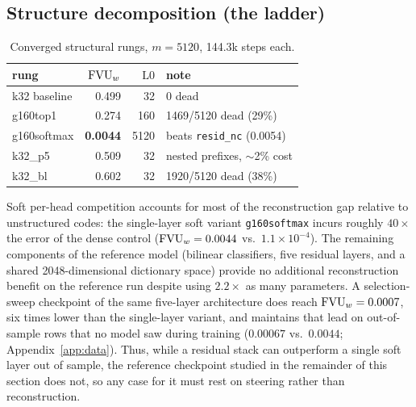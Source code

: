 \subsection{Structure decomposition (the ladder)}

\begin{table}[htbp]\centering\small
\begin{tabular}{@{}lrrl@{}}
\toprule
rung & $\mathrm{FVU}_w$ & $\mathrm{L0}$ & note \\
\midrule
k32 baseline    & 0.499 & 32   & 0 dead \\
g160top1        & 0.274 & 160  & 1469/5120 dead (29\%) \\
g160softmax     & \textbf{0.0044} & 5120 & beats \texttt{resid\_nc} (0.0054) \\
k32\_p5         & 0.509 & 32   & nested prefixes, $\sim$2\% cost \\
k32\_bl         & 0.602 & 32   & 1920/5120 dead (38\%) \\
\bottomrule
\end{tabular}
\caption{Converged structural rungs, $m{=}5120$, 144.3k steps each.}
\end{table}

Soft per-head competition accounts for most of the reconstruction gap
relative to unstructured codes: the single-layer soft variant
\texttt{g160softmax} incurs roughly $40\times$ the error of the dense
control ($\mathrm{FVU}_w = 0.0044$ vs.\ $1.1\times10^{-4}$). The remaining components
of the reference model (bilinear classifiers, five residual layers,
and a shared 2048-dimensional dictionary space) provide no additional
reconstruction benefit on the reference run despite using $2.2\times$ as
many parameters. A selection-sweep checkpoint of the same five-layer
architecture does reach $\mathrm{FVU}_w = 0.0007$, six times lower than the
single-layer variant, and maintains that lead on out-of-sample rows that no
model saw during training ($0.00067$ vs.\ $0.0044$; Appendix~\ref{app:data}).
Thus, while a residual stack can outperform a single soft layer out of
sample, the reference checkpoint studied in the remainder of this section
does not, so any case for it must rest on steering rather than
reconstruction.

